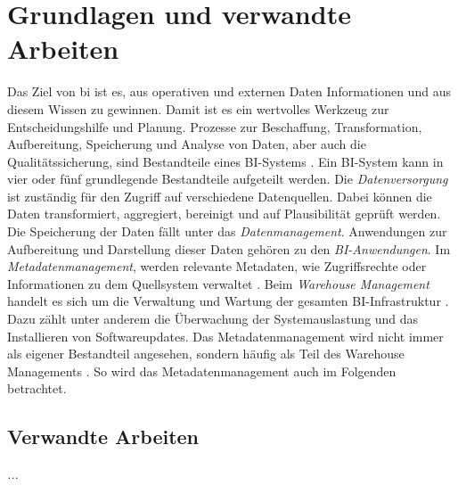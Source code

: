 \chapter{Grundlagen und verwandte Arbeiten} \label{ch:background}
Das Ziel von \ac{bi} ist es, aus operativen und externen Daten Informationen und aus diesem Wissen zu gewinnen. Damit ist es ein wertvolles Werkzeug zur Entscheidungshilfe und Planung. Prozesse zur Beschaffung, Transformation, Aufbereitung, Speicherung und Analyse von Daten, aber auch die Qualitätssicherung, sind Bestandteile eines BI-Systems \cite{muller_business_2013}. Ein BI-System kann in vier oder fünf grundlegende Bestandteile aufgeteilt werden. Die \textit{Datenversorgung} ist zuständig für den Zugriff auf verschiedene Datenquellen. Dabei können die Daten transformiert, aggregiert, bereinigt und auf Plausibilität geprüft werden. Die Speicherung der Daten fällt unter das \textit{Datenmanagement}. Anwendungen zur Aufbereitung und Darstellung dieser Daten gehören zu den \textit{BI-Anwendungen}. Im \textit{Metadatenmanagement}, werden relevante Metadaten, wie Zugriffsrechte oder Informationen zu dem Quellsystem verwaltet \cite{kemper_bi-glossar_2008}. Beim \textit{Warehouse Management} handelt es sich um die Verwaltung und Wartung der gesamten BI-Infrastruktur \cite{grunwald_business_2009}. Dazu zählt unter anderem die Überwachung der Systemauslastung und das Installieren von Softwareupdates. Das {Metadatenmanagement} wird nicht immer als eigener Bestandteil angesehen, sondern häufig als Teil des {Warehouse Managements} \cite{humm_architektur_2005}. So wird das {Metadatenmanagement} auch im Folgenden betrachtet.

\section{Verwandte Arbeiten} \label{ch:verwandteArbeiten}
\textit{...}

